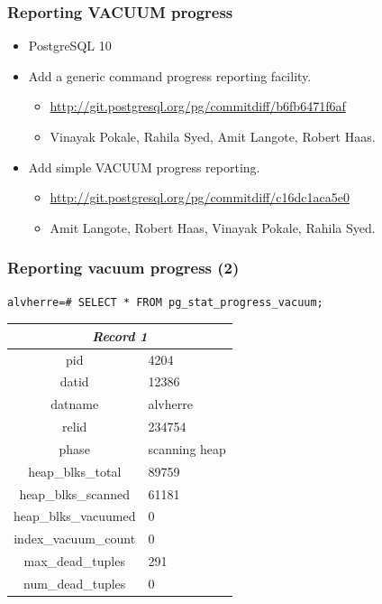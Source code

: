 \documentclass[ignorenonframetext,t]{beamer}
\begin{document}
\begin{frame}
  \frametitle{Reporting VACUUM progress}

  \begin{itemize}
    \item PostgreSQL 10
    \item Add a generic command progress reporting facility.
      \begin{itemize}
	\item \url{http://git.postgresql.org/pg/commitdiff/b6fb6471f6af}
	\item Vinayak Pokale, Rahila Syed, Amit Langote, Robert Haas.
      \end{itemize}
    \item Add simple VACUUM progress reporting.
      \begin{itemize}
	\item \url{http://git.postgresql.org/pg/commitdiff/c16dc1aca5e0}
	\item Amit Langote, Robert Haas, Vinayak Pokale, Rahila Syed.
      \end{itemize}
  \end{itemize}
\end{frame}

\begin{frame}[containsverbatim]
\frametitle{Reporting vacuum progress (2)}
  \footnotesize
\begin{verbatim}
alvherre=# SELECT * FROM pg_stat_progress_vacuum;
\end{verbatim}
\begin{tabular}{c|l}
\multicolumn{2}{c}{\textit{Record 1}} \\
\hline
pid & 4204 \\
datid & 12386 \\
datname & alvherre \\
relid & 234754 \\
phase & scanning heap \\
heap\_blks\_total & 89759 \\
heap\_blks\_scanned & 61181 \\
heap\_blks\_vacuumed & 0 \\
index\_vacuum\_count & 0 \\
max\_dead\_tuples & 291 \\
num\_dead\_tuples & 0 \\
\end{tabular}

\end{frame}
\end{document}
